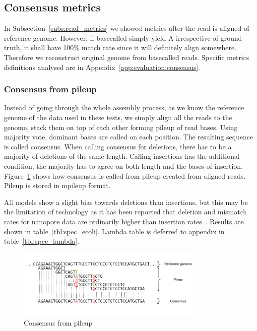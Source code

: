 \documentclass[runningheads,a4paper]{llncs}
\begin{document}
\subsection{Consensus metrics}

In Subsection~\ref{subs:read_metrics} we showed metrics after the read is aligned of reference genome. However, if basecalled simply yield A irrespective of ground truth, it shall have 100\% match rate since it will definitely align somewhere. Therefore we reconstruct original genome from basecalled reads. Specific metrics definitions analysed are in Appendix~\ref{app:evaluation:consensus}.

\subsubsection{Consensus from pileup}

Instead of going through the whole assembly process, as we know the reference genome of the data used in these tests, we simply align all the reads to the genome, stack them on top of each other forming pileup of read bases. Using majority vote, dominant bases are called on each position. The resulting sequence is called consensus. When calling consensus for deletions,  there has to be a majority of deletions of the same length. Calling insertions has the additional condition, the majority has to agree on both length and the bases of insertion. Figure~\ref{fg:consensus} shows how consensus is called from pileup created from aligned reads. Pileup is stored in mpileup format.

All models show a slight bias towards deletions than insertions, but this may be the limitation of technology as it has been reported that deletion and mismatch rates for nanopore data are ordinarily higher than insertion rates~\cite{sovic2016fast}. Results are shown in table~\ref{tbl:spec_ecoli}. Lambda table is deferred to appendix in table~\ref{tbl:spec_lambda}.

\begin{figure}[]
   \begin{center}
       \includegraphics[width=0.8\textwidth]{./imgs/consnesus.png}
       \caption{Consensus from pileup}
       \label{fg:consensus}
   \end{center}
\end{figure}
\end{document}
